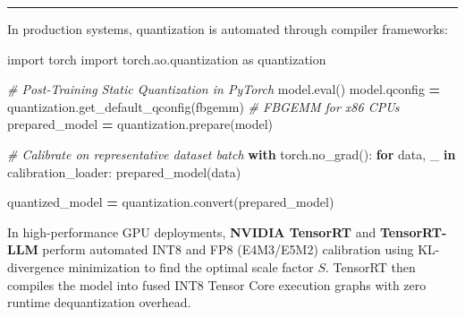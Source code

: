 \documentclass[
  letterpaper,
]{scrbook}
\newenvironment{Shaded}{\begin{snugshade}}{\end{snugshade}}
\newcommand{\BuiltInTok}[1]{#1}
\newcommand{\CommentTok}[1]{\textcolor[rgb]{0.56,0.35,0.01}{\textit{#1}}}
\newcommand{\ControlFlowTok}[1]{\textcolor[rgb]{0.13,0.29,0.53}{\textbf{#1}}}
\newcommand{\ImportTok}[1]{#1}
\newcommand{\KeywordTok}[1]{\textcolor[rgb]{0.13,0.29,0.53}{\textbf{#1}}}
\newcommand{\NormalTok}[1]{#1}
\newcommand{\OperatorTok}[1]{\textcolor[rgb]{0.81,0.36,0.00}{\textbf{#1}}}
\newcommand{\StringTok}[1]{\textcolor[rgb]{0.31,0.60,0.02}{#1}}
\begin{document}
\begin{center}\rule{0.5\linewidth}{0.5pt}\end{center}

\begin{tcolorbox}[enhanced jigsaw, arc=.35mm, bottomrule=.15mm, bottomtitle=1mm, breakable, colback=white, colbacktitle=quarto-callout-note-color!10!white, colframe=quarto-callout-note-color-frame, coltitle=black, left=2mm, leftrule=.75mm, opacityback=0, opacitybacktitle=0.6, rightrule=.15mm, title=\textcolor{quarto-callout-note-color}{\faInfo}\hspace{0.5em}{PyTorch Systems Bridge: \texttt{torch.ao.quantization} and NVIDIA
TensorRT}, titlerule=0mm, toprule=.15mm, toptitle=1mm]

In production systems, quantization is automated through compiler
frameworks:

\begin{Shaded}
\begin{Highlighting}[]
\ImportTok{import}\NormalTok{ torch}
\ImportTok{import}\NormalTok{ torch.ao.quantization }\ImportTok{as}\NormalTok{ quantization}

\CommentTok{\# Post{-}Training Static Quantization in PyTorch}
\NormalTok{model.}\BuiltInTok{eval}\NormalTok{()}
\NormalTok{model.qconfig }\OperatorTok{=}\NormalTok{ quantization.get\_default\_qconfig(}\StringTok{\textquotesingle{}fbgemm\textquotesingle{}}\NormalTok{)  }\CommentTok{\# FBGEMM for x86 CPUs}
\NormalTok{prepared\_model }\OperatorTok{=}\NormalTok{ quantization.prepare(model)}

\CommentTok{\# Calibrate on representative dataset batch}
\ControlFlowTok{with}\NormalTok{ torch.no\_grad():}
    \ControlFlowTok{for}\NormalTok{ data, \_ }\KeywordTok{in}\NormalTok{ calibration\_loader:}
\NormalTok{        prepared\_model(data)}

\NormalTok{quantized\_model }\OperatorTok{=}\NormalTok{ quantization.convert(prepared\_model)}
\end{Highlighting}
\end{Shaded}

In high-performance GPU deployments, \textbf{NVIDIA TensorRT} and
\textbf{TensorRT-LLM} perform automated INT8 and FP8 (E4M3/E5M2)
calibration using KL-divergence minimization to find the optimal scale
factor \(S\). TensorRT then compiles the model into fused INT8 Tensor
Core execution graphs with zero runtime dequantization overhead.

\end{tcolorbox}
\end{document}
